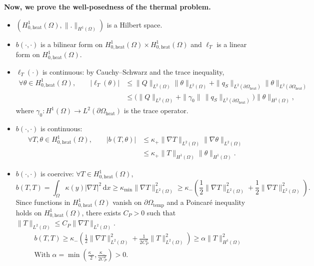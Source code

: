 \documentclass[a4paper,12pt,twoside]{report}
\begin{document}
\noindent \textbf{Now, we prove the well-posedness of the thermal problem.} 
\begin{itemize}
    \item $(H^1_{0,\text{heat}}(\Omega),\|.\|_{H^1(\Omega)})$ is a Hilbert space.
    \item $b(\cdot,\cdot)$ is a bilinear form on $H^1_{0,\text{heat}}(\Omega)\times H^1_{0,\text{heat}}(\Omega)$ and $\ell_T$ is a linear form on $H^1_{0,\text{heat}}(\Omega)$.
    \item $\ell_T(\cdot)$ is continuous: by Cauchy--Schwarz and the trace inequality,
    \begin{equation*}
    \begin{aligned}
    \forall \theta\in H^1_{0,\text{heat}}(\Omega),\qquad
    |\ell_T(\theta)|
    &\le \|Q\|_{L^2(\Omega)}\|\theta\|_{L^2(\Omega)} + \|q_S\|_{L^2(\partial\Omega_{\mathrm{heat}})}\|\theta\|_{L^2(\partial\Omega_{\mathrm{heat}})}\\
    &\le \Big(\|Q\|_{L^2(\Omega)} + \|\gamma_0\|\,\|q_S\|_{L^2(\partial\Omega_{\mathrm{heat}})}\Big)\|\theta\|_{H^1(\Omega)},
    \end{aligned}
    \end{equation*}
    where $\gamma_0: H^1(\Omega)\to L^2(\partial\Omega_{\mathrm{heat}})$ is the trace operator.
    \item $b(\cdot,\cdot)$ is continuous:
    \begin{equation*}
    \begin{aligned}
    \forall T,\theta\in H^1_{0,\text{heat}}(\Omega),\qquad
    |b(T,\theta)|
    &\le \kappa_{+}\|\nabla T\|_{L^2(\Omega)}\|\nabla\theta\|_{L^2(\Omega)}\\
    &\le \kappa_{+}\|T\|_{H^1(\Omega)}\|\theta\|_{H^1(\Omega)}.
    \end{aligned}
    \end{equation*}
    \item $b(\cdot,\cdot)$ is coercive: $\forall T\in H^1_{0,\text{heat}}(\Omega)$,
    \begin{equation*}
    b(T,T)=\int_\Omega \kappa(y)|\nabla T|^2\,\mathrm{d}x \ge \kappa_{\min}\|\nabla T\|_{L^2(\Omega)}^2 \ge \kappa_{-} \left( \frac{1}{2}  \|\nabla T\|_{L^2(\Omega)}^2 + \frac{1}{2}\|\nabla T\|_{L^2(\Omega)}^2\right).
    \end{equation*}
    Since functions in $H^1_{0,\text{heat}}(\Omega)$ vanish on $\partial\Omega_{\mathrm{temp}}$ and a Poincaré inequality holds on $H^1_{0,\text{heat}}(\Omega)$, there exists $C_P>0$ such that $\|T\|_{L^2(\Omega)}\le C_P\|\nabla T\|_{L^2(\Omega)}$. 
    \begin{equation*}
		\begin{aligned}
		& b(T,T) \ge \kappa_{-} \left( \frac{1}{2}  \|\nabla T\|_{L^2(\Omega)}^2 + \frac{1}{2C_P^2}\|T\|_{L^2(\Omega)}^2\right) \ge \alpha\|T\|_{H^1(\Omega)}^2 \\
		& \text{With } \alpha = \min\left(\frac{\kappa_{-}}{2}, \frac{\kappa_{-}}{2C_P^2}\right) > 0.
		\end{aligned}
    \end{equation*}
\end{itemize}
\end{document}
